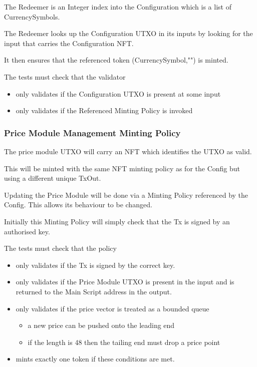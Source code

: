 \documentclass{article} %
\begin{document}
The Redeemer is an Integer index into the Configuration which is a list of CurrencySymbols.

The Redeemer looks up the Configuration UTXO in its inputs by looking for the input that carries the Configuration NFT.

It then ensures that the referenced token (CurrencySymbol,"") is minted.

The tests must check that the validator
\begin{itemize}
  \item only validates if the Configuration UTXO is present at some input
  \item only validates if the Referenced Minting Policy is invoked
\end{itemize}

\subsubsection{Price Module Management Minting Policy}
The price module UTXO will carry an NFT which identifies the UTXO as valid.

This will be minted with the same NFT minting policy as for the Config but using a different unique TxOut.

Updating the Price Module will be done via a Minting Policy referenced by the Config. This allows its behaviour to be changed.

Initially this Minting Policy will simply check that the Tx is signed by an authorised key.

The tests must check that the policy
\begin{itemize}
  \item only validates if the Tx is signed by the correct key.
  \item only validates if the Price Module UTXO is present in the input and is returned to the Main Script address in the output.
  \item only validates if the price vector is treated as a bounded queue
  \begin{itemize}
    \item a new price can be pushed onto the leading end
    \item if the length is 48 then the tailing end must drop a price point
  \end{itemize}
  \item mints exactly one token if these conditions are met.
\end{itemize}
\end{document}
